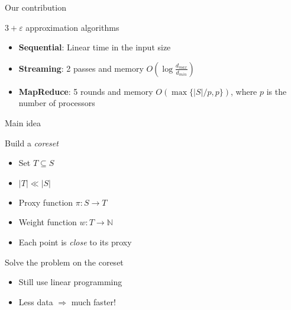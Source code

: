 \documentclass{beamer}
\renewcommand{\epsilon}{\varepsilon}
\begin{document}
\begin{frame}{Our contribution}

  \begin{center}
    \Large
    $3+\epsilon$ approximation algorithms
  \end{center}

  \begin{itemize}
    \vfill
    \item \textbf{Sequential}: Linear time in the input size
    \vfill
    \item \textbf{Streaming}: 2 passes and memory $O\left(\log \frac{d_{max}}{d_{min}}\right)$
    \vfill
    \item \textbf{MapReduce}: 5 rounds and memory
      $O\left( \max\{|S|/p, p\} \right)$, where $p$ is the number of processors
    \vfill
  \end{itemize}

\end{frame}

\begin{frame}{Main idea}
  \begin{block}{Build a \emph{coreset}}
    \begin{itemize}
      \item Set $T \subseteq S$
      \item $|T| \ll |S|$
      \item Proxy function $\pi: S \to T$
      \item Weight function $w: T \to \mathbb{N}$
      \pause\item Each point is \emph{close} to its proxy
    \end{itemize}
  \end{block}
  
  \vfill
  \pause

  \begin{block}{Solve the problem on the coreset}
    \begin{itemize}
      \item Still use linear programming
      \pause\item Less data $\Rightarrow$ much faster!
    \end{itemize}
  \end{block}
\end{frame}
\end{document}
